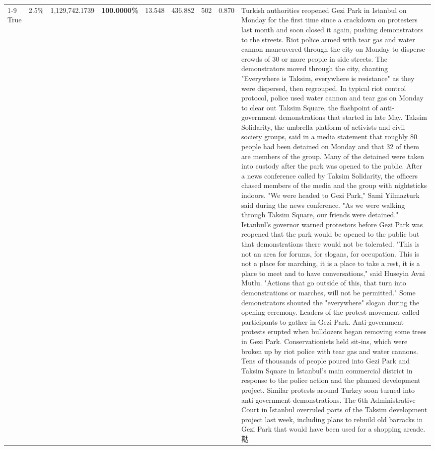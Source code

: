 \begin{table}[H]
\begin{tabular}{lllrlllll}
\cline{1-9}
True & 2.5\% & 1,129,742.1739 & \bfseries \color{red} 100.0000\% & 13.548 & 436.882 & 502 & 0.870 & Turkish authorities reopened Gezi Park in Istanbul on Monday for the first time since a crackdown on protesters last month and soon closed it again, pushing demonstrators to the streets. Riot police armed with tear gas and water cannon maneuvered through the city on Monday to disperse crowds of 30 or more people in side streets. The demonstrators moved through the city, chanting "Everywhere is Taksim, everywhere is resistance" as they were dispersed, then regrouped. In typical riot control protocol, police used water cannon and tear gas on Monday to clear out Taksim Square, the flashpoint of anti-government demonstrations that started in late May. Taksim Solidarity, the umbrella platform of activists and civil society groups, said in a media statement that roughly 80 people had been detained on Monday and that 32 of them are members of the group. Many of the detained were taken into custody after the park was opened to the public. After a news conference called by Taksim Solidarity, the officers chased members of the media and the group with nightsticks indoors. "We were headed to Gezi Park," Sami Yilmazturk said during the news conference. "As we were walking through Taksim Square, our friends were detained." Istanbul's governor warned protestors before Gezi Park was reopened that the park would be opened to the public but that demonstrations there would not be tolerated. "This is not an area for forums, for slogans, for occupation. This is not a place for marching, it is a place to take a rest, it is a place to meet and to have conversations," said Huseyin Avni Mutlu. "Actions that go outside of this, that turn into demonstrations or marches, will not be permitted." Some demonstrators shouted the "everywhere" slogan during the opening ceremony. Leaders of the protest movement called participants to gather in Gezi Park. Anti-government protests erupted when bulldozers began removing some trees in Gezi Park. Conservationists held sit-ins, which were broken up by riot police with tear gas and water cannons. Tens of thousands of people poured into Gezi Park and Taksim Square in Istanbul's main commercial district in response to the police action and the planned development project. Similar protests around Turkey soon turned into anti-government demonstrations. The 6th Administrative Court in Istanbul overruled parts of the Taksim development project last week, including plans to rebuild old barracks in Gezi Park that would have been used for a shopping arcade.鞑 \\

\end{tabular}
\end{table}
